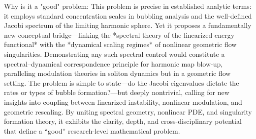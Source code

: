 Why is it a "good" problem:  
This problem is precise in established analytic terms: it employs standard concentration scales in bubbling analysis and the well-defined Jacobi spectrum of the limiting harmonic sphere. Yet it proposes a fundamentally new conceptual bridge—linking the *spectral theory of the linearized energy functional* with the *dynamical scaling regimes* of nonlinear geometric flow singularities. Demonstrating any such spectral control would constitute a spectral–dynamical correspondence principle for harmonic map blow-up, paralleling modulation theories in soliton dynamics but in a geometric flow setting. The problem is simple to state—do the Jacobi eigenvalues dictate the rates or types of bubble formation?—but deeply nontrivial, calling for new insights into coupling between linearized instability, nonlinear modulation, and geometric rescaling. By uniting spectral geometry, nonlinear PDE, and singularity formation theory, it exhibits the clarity, depth, and cross-disciplinary potential that define a “good” research-level mathematical problem.